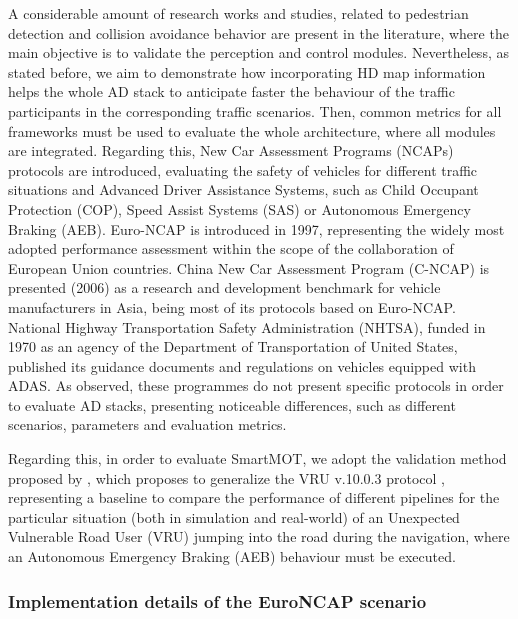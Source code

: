 A considerable amount of research works and studies, related to pedestrian detection and collision avoidance behavior are present in the literature, where the main objective is to validate the perception and control modules. Nevertheless, as stated before, we aim to demonstrate how incorporating HD map information helps the whole AD stack to anticipate faster the behaviour of the traffic participants in the corresponding traffic scenarios. Then, common metrics for all frameworks must be used to evaluate the whole architecture, where all modules are integrated. Regarding this, New Car Assessment Programs (NCAPs) protocols are introduced, evaluating the safety of vehicles for different traffic situations and Advanced Driver Assistance Systems, such as Child Occupant Protection (COP), Speed Assist Systems (SAS) or Autonomous Emergency Braking (AEB). Euro-NCAP \cite{article_EuroNCAP_2} is introduced in 1997, representing the widely most adopted performance assessment within the scope of the collaboration of European Union countries. China New Car Assessment Program (C-NCAP) \cite{article_CNCAP} is presented (2006) as a research and development benchmark for vehicle manufacturers in Asia, being most of its protocols based on Euro-NCAP. National Highway Transportation Safety Administration (NHTSA), funded in 1970 as an agency of the Department of Transportation of United States, published \cite{article_NHTSA} its guidance documents and regulations on vehicles equipped with ADAS. As observed, these programmes do not present specific protocols in order to evaluate AD stacks, presenting noticeable differences, such as different scenarios, parameters and evaluation metrics. 

Regarding this, in order to evaluate SmartMOT, we adopt the validation method proposed by \cite{gutierrez2021validation}, which proposes to generalize the \ac{VRU} v.10.0.3 protocol \cite{web_VRU_assessment_protocol}, representing a baseline to compare the performance of different pipelines for the particular situation (both in simulation and real-world) of an Unexpected Vulnerable Road User (VRU) jumping into the road during the navigation, where an Autonomous Emergency Braking (AEB) behaviour must be executed. 

\subsubsection{Implementation details of the EuroNCAP scenario}
\label{subsubsec:4_euroncap_implementation_details}

